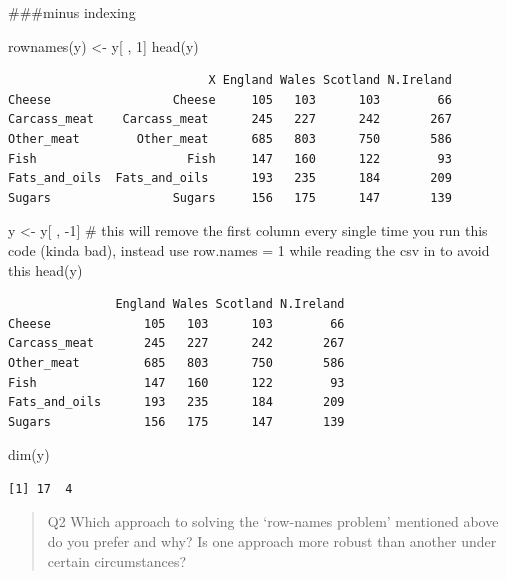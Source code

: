\documentclass[
  letterpaper,
  DIV=11,
  numbers=noendperiod]{scrartcl}
\newenvironment{Shaded}{\begin{snugshade}}{\end{snugshade}}
\newcommand{\CommentTok}[1]{\textcolor[rgb]{0.37,0.37,0.37}{#1}}
\newcommand{\DecValTok}[1]{\textcolor[rgb]{0.68,0.00,0.00}{#1}}
\newcommand{\FunctionTok}[1]{\textcolor[rgb]{0.28,0.35,0.67}{#1}}
\newcommand{\NormalTok}[1]{\textcolor[rgb]{0.00,0.23,0.31}{#1}}
\newcommand{\OtherTok}[1]{\textcolor[rgb]{0.00,0.23,0.31}{#1}}
\newcommand{\SpecialCharTok}[1]{\textcolor[rgb]{0.37,0.37,0.37}{#1}}
\begin{document}
\#\#\#minus indexing

\begin{Shaded}
\begin{Highlighting}[]
\FunctionTok{rownames}\NormalTok{(y) }\OtherTok{\textless{}{-}}\NormalTok{ y[ , }\DecValTok{1}\NormalTok{]}
\FunctionTok{head}\NormalTok{(y)}
\end{Highlighting}
\end{Shaded}

\begin{verbatim}
                            X England Wales Scotland N.Ireland
Cheese                 Cheese     105   103      103        66
Carcass_meat    Carcass_meat      245   227      242       267
Other_meat        Other_meat      685   803      750       586
Fish                     Fish     147   160      122        93
Fats_and_oils  Fats_and_oils      193   235      184       209
Sugars                 Sugars     156   175      147       139
\end{verbatim}

\begin{Shaded}
\begin{Highlighting}[]
\NormalTok{y }\OtherTok{\textless{}{-}}\NormalTok{ y[ , }\SpecialCharTok{{-}}\DecValTok{1}\NormalTok{] }\CommentTok{\# this will remove the first column every single time you run this code (kinda bad), instead use row.names = 1 while reading the csv in to avoid this}
\FunctionTok{head}\NormalTok{(y)}
\end{Highlighting}
\end{Shaded}

\begin{verbatim}
               England Wales Scotland N.Ireland
Cheese             105   103      103        66
Carcass_meat       245   227      242       267
Other_meat         685   803      750       586
Fish               147   160      122        93
Fats_and_oils      193   235      184       209
Sugars             156   175      147       139
\end{verbatim}

\begin{Shaded}
\begin{Highlighting}[]
\FunctionTok{dim}\NormalTok{(y)}
\end{Highlighting}
\end{Shaded}

\begin{verbatim}
[1] 17  4
\end{verbatim}

\begin{quote}
Q2 Which approach to solving the `row-names problem' mentioned above do
you prefer and why? Is one approach more robust than another under
certain circumstances?
\end{quote}
\end{document}
